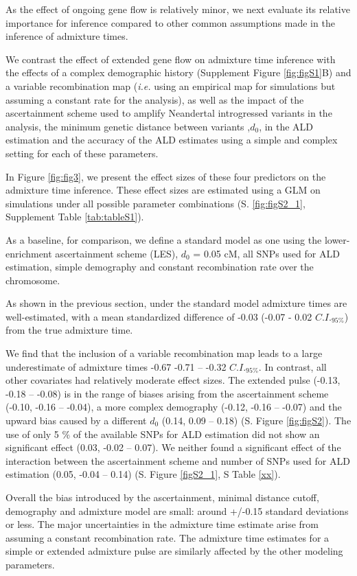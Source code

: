 \documentclass[11pt]{article}
\begin{document}
As the effect of ongoing gene flow is relatively minor, we next evaluate its relative importance for inference compared to other common assumptions made in the inference of admixture times. 

We contrast the effect of extended gene flow on admixture time inference with  the effects of a complex demographic history (Supplement Figure \ref{fig:figS1}B) and a variable recombination map (\emph{i.e.} using an empirical map for simulations but assuming a constant rate for the analysis), as well as the impact of the ascertainment scheme used to amplify Neandertal introgressed variants in the analysis, the minimum genetic distance between variants ,$d_0$, in the ALD estimation and the accuracy of the ALD estimates using a simple and complex setting for each of these parameters. 

In Figure \ref{fig:fig3}, we present the effect sizes of these four predictors on the admixture time inference. These effect sizes are estimated using a GLM on simulations under all possible parameter combinations  (S. \ref{fig:figS2_1}, Supplement Table \ref{tab:tableS1}).

As a baseline, for comparison, we define a standard model as one using the lower-enrichment ascertainment scheme (LES), $d_{0}$ = 0.05 cM, all SNPs used for ALD estimation, simple demography and constant recombination rate over the chromosome. 

As shown in the previous section, under the standard model admixture times are well-estimated, with a mean standardized difference of  -0.03 (-0.07 - 0.02 $C.I._{95\%}$) from the true
admixture time.

We find that the  inclusion of a variable recombination map leads to a large underestimate of admixture times -0.67 -0.71 -- -0.32 $C.I._{95\%}$. In contrast, all other covariates had relatively moderate effect sizes. The extended pulse   (-0.13,  -0.18 -- -0.08) is in the range of biases arising from the ascertainment scheme (-0.10, -0.16 --
-0.04), a more complex demography (-0.12, -0.16 -- -0.07) and the upward bias caused by a different $d_0$ (0.14, 0.09 --
0.18) (S. Figure \ref{fig:figS2}). The use of only 5 \% of the available SNPs for ALD estimation did not show an significant effect (0.03, -0.02 -- 0.07). We neither found a significant effect of the interaction between the ascertainment scheme and number of SNPs used for ALD estimation (0.05, -0.04 -- 0.14) (S. Figure \ref{figS2_1}, S Table \ref{xx}). 

Overall the bias introduced by the ascertainment, minimal distance
cutoff, demography and admixture model are small: around +/-0.15 standard deviations or less. The major uncertainties in the admixture time
estimate arise from assuming a constant recombination rate. The
admixture time estimates for a simple or extended admixture pulse are similarly affected by the other modeling parameters.
\end{document}
